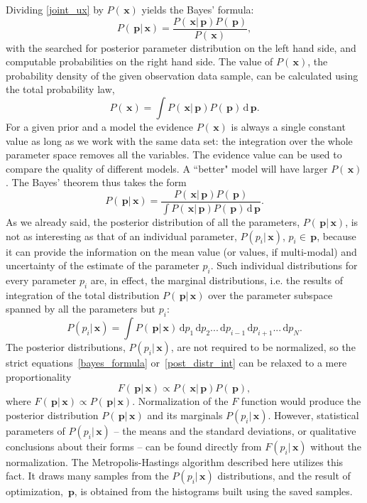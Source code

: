 \documentclass[preprint2]{aastex}
\newcommand{\bfp}{\,\mathbf{p}}
\newcommand{\bfx}{\,\mathbf{x}}
\newcommand{\ud}{\,\mathrm{d}}
\begin{document}
Dividing \eqref{joint_ux} by $P(\bfx)$ yields the Bayes' formula:
\begin{equation}
  \label{bayes_formula}
  P(\bfp|\bfx) =  \frac{P(\bfx|\bfp)P(\bfp)}{P(\bfx)},
\end{equation}
with the searched for posterior parameter distribution on the left hand side, and computable probabilities on the right hand side. The value of $P(\bfx)$, the probability density of the given observation data sample, can be calculated using the total probability law,
\begin{equation}
  P(\bfx) = \int P(\bfx|\bfp)P(\bfp) \ud \bfp.
\end{equation}
For a given prior and a model the evidence $P(\bfx)$ is always a single constant value as long as we work with the same data set: the integration over the whole parameter space removes all the variables. The evidence value can be used to compare the quality of different models. A ``better" model will have larger $P(\bfx)$. The Bayes' theorem thus takes the form
\begin{equation}
  \label{post_distr_int}
  P(\bfp|\bfx) =  \frac{P(\bfx|\bfp)P(\bfp)}{\int P(\bfx|\bfp)P(\bfp) \ud \bfp}.
\end{equation}
As we already said, the posterior distribution of all the parameters, $P(\bfp|\bfx)$, is not as interesting as that of an individual parameter, $P(p_i|\bfx)$, $p_i \in \bfp$, because it can provide the information on the mean value (or values, if multi-modal) and uncertainty of the estimate of the parameter $p_i$. Such individual distributions for every parameter $p_i$ are, in effect, the marginal distributions, i.e. the results of integration of the total distribution $P(\bfp|\bfx)$ over the parameter subspace spanned by all the parameters but $p_i$:
\begin{equation}
  \label{param_post_distr}
  P(p_i|\bfx) =  \int P(\bfp|\bfx)\ud p_1 \ud p_2 ... \ud p_{i-1} \ud p_{i+1} ... \ud p_N.
\end{equation}
The posterior distributions, $P(p_i|\bfx)$, are not required to be normalized, so the strict equations~\eqref{bayes_formula} or~\eqref{post_distr_int} can be relaxed to a mere proportionality
\begin{equation}
  \label{bayes_propor}
  F(\bfp|\bfx) \propto P(\bfx|\bfp)P(\bfp),
\end{equation}
where $F(\bfp|\bfx) \propto P(\bfp|\bfx)$. Normalization of the $F$ function would produce the posterior distribution $P(\bfp|\bfx)$ and its marginals $P(p_i|\bfx)$. However, statistical parameters of $P(p_i|\bfx)$ -- the means and the standard deviations, or qualitative conclusions about their forms -- can be found directly from $F(p_i|\bfx)$ without the normalization. The Metropolis-Hastings algorithm described here utilizes this fact. It draws many samples from the $P(p_i|\bfx)$ distributions, and the result of optimization, $\bfp$, is obtained from the histograms built using the saved samples. 
\end{document}
